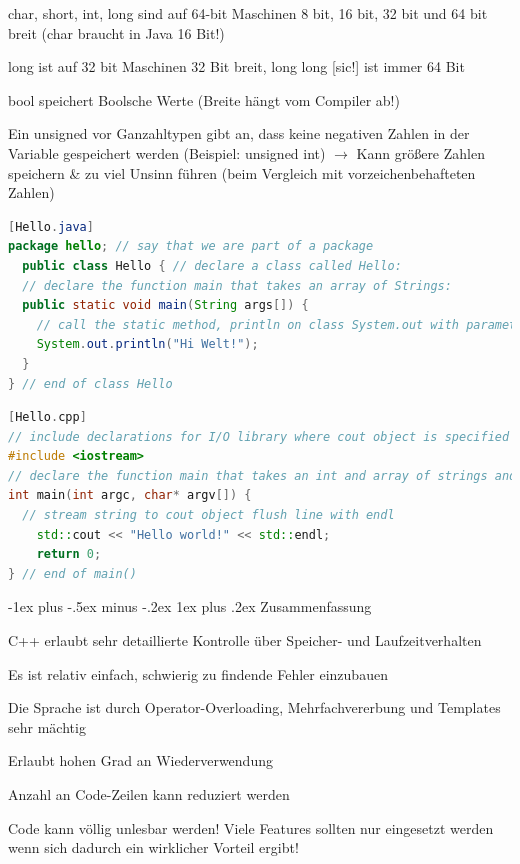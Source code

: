 \documentclass[10pt]{article}
\makeatletter
\renewcommand{\subsubsection}{\@startsection{subsubsection}{3}{0mm}%
                                {-1ex plus -.5ex minus -.2ex}%
                                {1ex plus .2ex}%
                                {\normalfont\small\bfseries}}
\makeatother
\begin{document}
\begin{itemize*}
\begin{itemize*}
    \item char, short, int, long sind auf 64-bit Maschinen 8 bit, 16 bit, 32 bit und 64 bit breit (char braucht in Java 16 Bit!)
    \item long ist auf 32 bit Maschinen 32 Bit breit, long long [sic!] ist immer 64 Bit
    \item bool speichert Boolsche Werte (Breite hängt vom Compiler ab!)
    \item Ein unsigned vor Ganzahltypen gibt an, dass keine negativen Zahlen in der Variable gespeichert werden (Beispiel: unsigned int) $\rightarrow$ Kann größere Zahlen speichern \& zu viel Unsinn führen (beim Vergleich mit vorzeichenbehafteten Zahlen)
  \end{itemize*}
\end{itemize*}

\begin{lstlisting}[language=java]
[Hello.java] 
package hello; // say that we are part of a package
  public class Hello { // declare a class called Hello:
  // declare the function main that takes an array of Strings:
  public static void main(String args[]) {
    // call the static method, println on class System.out with parameter "Hi Welt!":
    System.out.println("Hi Welt!");
  }
} // end of class Hello
\end{lstlisting}

\begin{lstlisting}[language=C++]
[Hello.cpp]
// include declarations for I/O library where cout object is specified in namespace std::
#include <iostream>
// declare the function main that takes an int and array of strings and returns an int as the exit code
int main(int argc, char* argv[]) {
  // stream string to cout object flush line with endl
    std::cout << "Hello world!" << std::endl;
    return 0;
} // end of main()
\end{lstlisting}

\subsubsection{Zusammenfassung}
\begin{itemize*}
  \item C++ erlaubt sehr detaillierte Kontrolle über Speicher- und Laufzeitverhalten
  \item Es ist relativ einfach, schwierig zu findende Fehler einzubauen
  \item Die Sprache ist durch Operator-Overloading, Mehrfachvererbung und Templates sehr mächtig
  \item Erlaubt hohen Grad an Wiederverwendung
  \item Anzahl an Code-Zeilen kann reduziert werden
  \item Code kann völlig unlesbar werden! Viele Features sollten nur eingesetzt werden wenn sich dadurch ein wirklicher Vorteil ergibt!
\end{itemize*}
\end{document}
